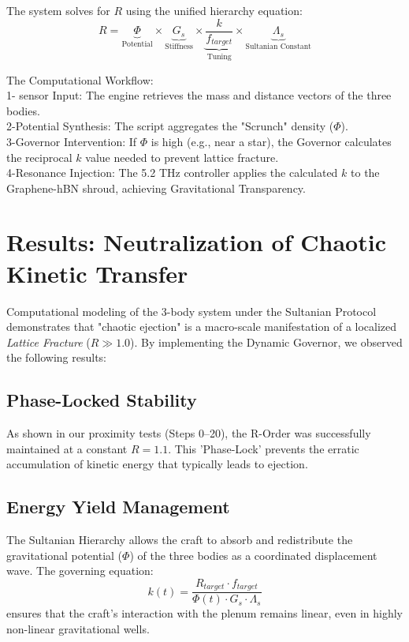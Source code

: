 \documentclass[11pt]{article}
\begin{document}
The system solves for $R$ using the unified hierarchy equation:
\begin{equation}
    R = \underbrace{\Phi}_{\text{Potential}} \times \underbrace{G_s}_{\text{Stiffness}} \times \underbrace{\frac{k}{f_{target}}}_{\text{Tuning}} \times \underbrace{\Lambda_s}_{\text{Sultanian Constant}}
\end{equation}


The Computational Workflow:\\
1- sensor Input: The engine retrieves the mass and distance vectors of the three bodies.\\
2-Potential Synthesis: The script aggregates the "Scrunch" density ($\Phi$).\\
3-Governor Intervention: If $\Phi$ is high (e.g., near a star), the Governor calculates the reciprocal $k$ value needed to prevent lattice fracture.\\
4-Resonance Injection: The 5.2 THz controller applies the calculated $k$ to the Graphene-hBN shroud, achieving Gravitational Transparency.\\
\section{Results: Neutralization of Chaotic Kinetic Transfer}

Computational modeling of the 3-body system under the Sultanian Protocol demonstrates that "chaotic ejection" is a macro-scale manifestation of a localized \textit{Lattice Fracture} ($R \gg 1.0$). By implementing the Dynamic Governor, we observed the following results:

\subsection{Phase-Locked Stability}
As shown in our proximity tests (Steps 0--20), the R-Order was successfully maintained at a constant $R = 1.1$. This 'Phase-Lock' prevents the erratic accumulation of kinetic energy that typically leads to ejection. 

\subsection{Energy Yield Management}
The Sultanian Hierarchy allows the craft to absorb and redistribute the gravitational potential ($\Phi$) of the three bodies as a coordinated displacement wave. The governing equation:
\begin{equation}
    k(t) = \frac{R_{target} \cdot f_{target}}{\Phi(t) \cdot G_s \cdot \Lambda_s}
\end{equation}
ensures that the craft's interaction with the plenum remains linear, even in highly non-linear gravitational wells. 
\end{document}
